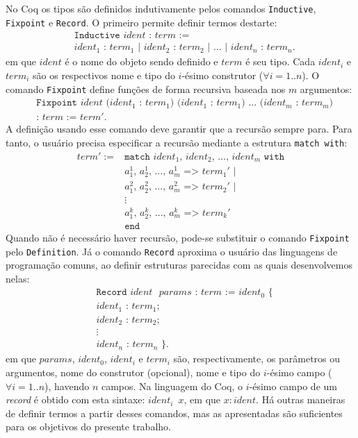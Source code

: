 No Coq os tipos são definidos indutivamente pelos comandos \texttt{Inductive}, \texttt{Fixpoint} e \texttt{Record}. O primeiro permite definir termos destarte: \begin{align*}
&\texttt{Inductive $ident$ : $term$ :=}\\ &\texttt{$ident_1$ : $term_1$ | $ident_2$ : $term_2$ | $...$ | $ident_n$ : $term_n$.}
\end{align*} em que $ident$ é o nome do objeto sendo definido e $term$ é seu tipo. Cada $ident_i$ e $term_i$ são os respectivos nome e tipo do $i$-ésimo construtor ($\forall i=1..n$). O comando \texttt{Fixpoint} define funções de forma recursiva baseada nos $m$ argumentos: \begin{align*}
&\texttt{Fixpoint $ident$ ($ident_1$ : $term_1$) ($ident_1$ : $term_1$) $...$ ($ident_m$ : $term_m$)}\\&\texttt{: $term$ := $term'$.}
\end{align*} A definição usando esse comando deve garantir que a recursão sempre para. Para tanto, o usuário precisa especificar a recursão mediante a estrutura \texttt{match with}: \begin{align*}
term' := \text{} & \texttt{match $ident_1$, $ident_2$, $...$, $ident_m$ with}\\
& \texttt{$a_1^1$, $a_2^1$, $...$, $a_m^1$ => $term_1'$ |}\\
& \texttt{$a_1^2$, $a_2^2$, $...$, $a_m^2$ => $term_2'$ |}\\
& \vdots\\
& \texttt{$a_1^k$, $a_2^k$, $...$, $a_m^k$ => $term_k'$}\\
& \texttt{end}
\end{align*} Quando não é necessário haver recursão, pode-se substituir o comando \texttt{Fixpoint} pelo \texttt{Definition}. Já o comando \texttt{Record} aproxima o usuário das linguagens de programação comuns, ao definir estruturas parecidas com as quais desenvolvemos nelas: \begin{align*}
&\texttt{Record $ident$ $params$ : $term$ := $ident_0$ \{}\\
&\texttt{$ident_1$ : $term_1$;}\\
&\texttt{$ident_2$ : $term_2$;}\\
&\vdots\\
&\texttt{$ident_n$ : $term_n$ \}.}
\end{align*} em que $params$, $ident_0$, $ident_i$ e $term_i$ são, respectivamente, os parâmetros ou argumentos, nome do construtor (opcional), nome e tipo do $i$-ésimo campo ($\forall i = 1..n$), havendo $n$ campos. Na linguagem do Coq, o $i$-ésimo campo de um \textit{record} é obtido com esta sintaxe: \texttt{$ident_i$ $x$}, em que $x : ident$. Há outras maneiras de definir termos a partir desses comandos, mas as apresentadas são suficientes para os objetivos do presente trabalho.

